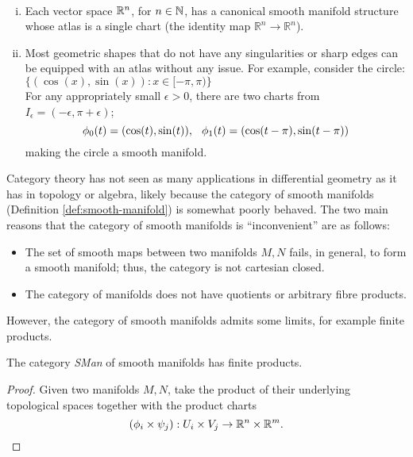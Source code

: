 \begin{example}
    ~\begin{enumerate}[(i)]
        \item Each vector space $\mathbb{R}^n$, for $n\in \mathbb{N}$, has a canonical smooth manifold structure whose atlas is a single chart (the identity map $\mathbb{R}^n \to \mathbb{R}^n$).
        \item Most geometric shapes that do not have any singularities or sharp edges can be equipped with an atlas without any issue.
        For example, consider the circle:  $\{ (\cos(x), \sin(x)) : x \in [-\pi, \pi) \}$
        \[\]
        For any appropriately small $\epsilon>0$, there are two charts from $I_\epsilon = (-\epsilon, \pi+\epsilon)$; 
        \[
            \phi_0(t) = (\cos(t), \sin(t)), \hspace{0.25cm} \phi_1(t) = (\cos(t-\pi), \sin(t-\pi))
        \]
        making the circle a smooth manifold. 
    \end{enumerate}
\end{example}
Category theory has not seen as many applications in differential geometry as it has in topology or algebra, likely because the category of smooth manifolds (Definition \ref{def:smooth-manifold}) is somewhat poorly behaved.
The two main reasons that the category of smooth manifolds is ``inconvenient'' are as follows:
\begin{itemize}
    \item The set of smooth maps between two manifolds $M, N$ fails, in general, to form a smooth manifold; thus, the category is not cartesian closed.
    \item The category of manifolds does not have quotients or arbitrary fibre products.
\end{itemize}
However, the category of smooth manifolds admits some limits, for example finite products.
\begin{proposition}
    The category \emph{SMan} of smooth manifolds has finite products.
\end{proposition}
\begin{proof}
    Given two manifolds $M, N$, take the product of their underlying topological spaces together with the product charts
    \[
        (\phi_i \times \psi_j): U_i \times V_j \to \mathbb{R}^n \times \mathbb{R}^m.
    \]
\end{proof}
